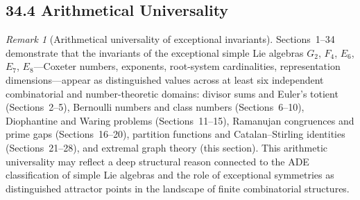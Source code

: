 \documentclass[11pt]{amsart}
\theoremstyle{plain}
\theoremstyle{definition}
\theoremstyle{remark}
\newtheorem{remark}[theorem]{Remark}
\begin{document}
\subsection*{34.4 Arithmetical Universality}

\begin{remark}[Arithmetical universality of exceptional invariants]%
\label{rem:universality}
Sections~1--34 demonstrate that the invariants of the exceptional
simple Lie algebras $G_2$, $F_4$, $E_6$, $E_7$, $E_8$---Coxeter numbers,
exponents, root-system cardinalities, representation dimensions---appear
as distinguished values across at least six independent combinatorial
and number-theoretic domains: divisor sums and Euler's totient
(Sections~2--5), Bernoulli numbers and class numbers (Sections~6--10),
Diophantine and Waring problems (Sections~11--15), Ramanujan congruences
and prime gaps (Sections~16--20), partition functions and
Catalan--Stirling identities (Sections~21--28), and extremal graph
theory (this section).  This arithmetic universality may reflect a
deep structural reason connected to the ADE classification of simple
Lie algebras and the role of exceptional symmetries as distinguished
attractor points in the landscape of finite combinatorial structures.
\end{remark}

\end{document}
